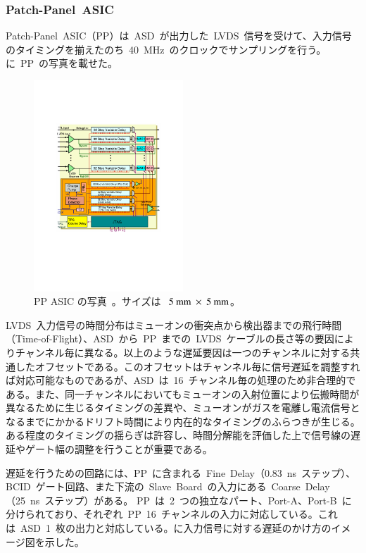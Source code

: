 \subsubsection{Patch-Panel~ASIC}
Patch-Panel~ASIC（PP）は~ASD~が出力した~LVDS~信号を受けて、入力信号のタイミングを揃えたのち~40~MHz~のクロックでサンプリングを行う。に~PP~の写真を載せた。

\begin{figure}[H]
        \centering   
        \includegraphics[width=0.5\textwidth,page=2]{img/pdf/PP.pdf}
        \caption[PP ASIC の写真]{PP ASIC の写真~\cite{URL:05}。サイズは~$~5~\rm{mm}~\times~5~\rm{mm}$。}
        \label{fig:PPphoto}
\end{figure}

LVDS~入力信号の時間分布はミューオンの衝突点から検出器までの飛行時間（Time-of-Flight）、ASD~から~PP~までの~LVDS~ケーブルの長さ等の要因によりチャンネル毎に異なる。以上のような遅延要因は一つのチャンネルに対する共通したオフセットである。このオフセットはチャンネル毎に信号遅延を調整すれば対応可能なものであるが、ASD~は~16~チャンネル毎の処理のため非合理的である。また、同一チャンネルにおいてもミューオンの入射位置により伝搬時間が異なるために生じるタイミングの差異や、ミューオンがガスを電離し電流信号となるまでにかかるドリフト時間により内在的なタイミングのふらつきが生じる。ある程度のタイミングの揺らぎは許容し、時間分解能を評価した上で信号線の遅延やゲート幅の調整を行うことが重要である。

遅延を行うための回路には、PP~に含まれる~Fine~Delay（0.83~ns~ステップ）、BCID~ゲート回路、また下流の~Slave~Board~の入力にある~Coarse~Delay（25~ns~ステップ）がある。
PP~は~2~つの独立なパート、Port-A、Port-B~に分けられており、それぞれ~PP~16~チャンネルの入力に対応している。これは~ASD~1~枚の出力と対応している。に入力信号に対する遅延のかけ方のイメージ図を示した。

